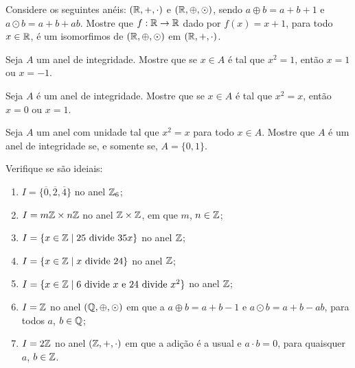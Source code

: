 \documentclass[12pt]{exam}
\begin{document}
    \vspace{.3cm}

    \questao{} Considere os seguintes an{\'e}is: $(\mathbb{R}, +, \cdot)$ e $(\mathbb{R}, \oplus, \odot)$, sendo $a \oplus b = a + b + 1$ e $a \odot b = a + b + ab$. Mostre que $f : \mathbb{R} \to \mathbb{R}$ dado por $f(x) = x + 1$, para todo $x \in \mathbb{R}$, {\'e} um isomorfimos de $(\mathbb{R}, \oplus, \odot)$ em $(\mathbb{R}, +, \cdot)$.

    \vspace{.3cm}

    \questao{} Seja $A$ um anel de integridade. Mostre que se $x \in A$ \'e tal que $x^2 = 1$, ent\~ao $x = 1$ ou $x = -1$.

    \vspace{.3cm}

    \questao{} Seja $A$ \'e um anel de integridade. Mostre que se $x \in A$ \'e tal que $x ^2 = x$, ent\~ao $x = 0$ ou $x = 1$.

    \vspace{.3cm}

    \questao{} Seja $A$ um anel com unidade tal que $x^2 = x$ para todo $x \in A$. Mostre que $A$ \'e um anel de integridade se, e somente se, $A = \{0, 1\}$.

    \vspace{.3cm}

    \questao{} Verifique se s\~ao ideiais:
    \begin{enumerate}[label=({\alph*})]
        \item  $I = \{\overline{0}, \overline{2}, \overline{4}\}$ no anel $\mathbb{Z}_6$;

        \item $I = m\mathbb{Z} \times n\mathbb{Z}$ no anel $\mathbb{Z} \times \mathbb{Z}$, em que $m$, $n \in \mathbb{Z}$;

        \item $I = \{x \in \mathbb{Z} \mid 25 \mbox{ divide } 35x\}$ no anel $\mathbb{Z}$;

        \item $I = \{x \in \mathbb{Z} \mid x \mbox{ divide } 24\}$ no anel $\mathbb{Z}$;

        \item $I = \{x \in \mathbb{Z} \mid 6 \mbox{ divide } x \mbox{ e } 24 \mbox{ divide } x^2\}$ no anel $\mathbb{Z}$;

        \item $I = \mathbb{Z}$ no anel $(\mathbb{Q}, \oplus, \odot)$ em que a $a \oplus b = a + b - 1$ e $a \odot b = a + b - ab$, para todos $a$, $b \in \mathbb{Q}$;

        \item $I = 2\mathbb{Z}$ no anel $(\mathbb{Z}, +, \cdot)$ em que a adi\c{c}\~ao \'e a usual e $a \cdot b = 0$, para quaisquer $a$, $b \in \mathbb{Z}$.
    \end{enumerate}
\end{document}
